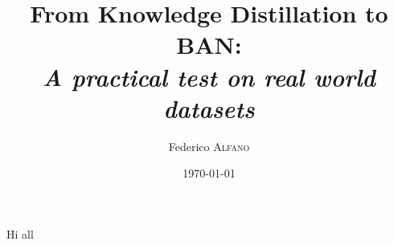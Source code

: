 \documentclass{article}
\title{From Knowledge Distillation to BAN:\\ \textit{A practical test on real world datasets}} %
\author{Federico \textsc{Alfano}}
\date{\today} %
\begin{document}
\maketitle

Hi all
\end{document}
